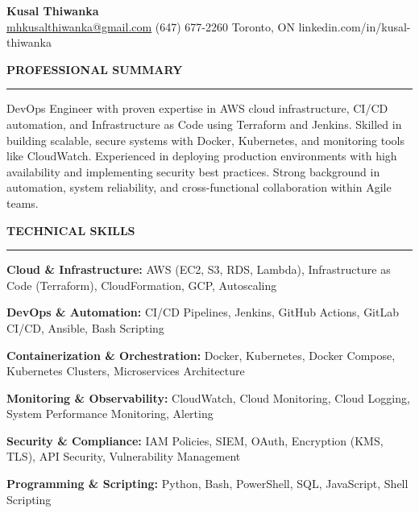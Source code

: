 \documentclass[10pt,letterpaper]{article}
\begin{document}
\begin{center}
{\LARGE\textbf{Kusal Thiwanka}}\\[3pt]
\href{mailto:mhkusalthiwanka@gmail.com}{mhkusalthiwanka@gmail.com}\hspace{2em}%
(647) 677{-}2260\hspace{2em}%
Toronto, ON\hspace{2em}
linkedin.com/in/kusal-thiwanka
\end{center}

\vspace{6pt}

\textbf{PROFESSIONAL SUMMARY}\\[-8pt]
\noindent\rule{\textwidth}{1pt}

\vspace{-2pt}

DevOps Engineer with proven expertise in AWS cloud infrastructure, CI/CD automation, and Infrastructure as Code using Terraform and Jenkins. Skilled in building scalable, secure systems with Docker, Kubernetes, and monitoring tools like CloudWatch. Experienced in deploying production environments with high availability and implementing security best practices. Strong background in automation, system reliability, and cross-functional collaboration within Agile teams.

\vspace{8pt}

\textbf{TECHNICAL SKILLS}\\[-8pt]
\noindent\rule{\textwidth}{1pt}

\vspace{-2pt}

\textbf{Cloud \& Infrastructure:} AWS (EC2, S3, RDS, Lambda), Infrastructure as Code (Terraform), CloudFormation, GCP, Autoscaling

\textbf{DevOps \& Automation:} CI/CD Pipelines, Jenkins, GitHub Actions, GitLab CI/CD, Ansible, Bash Scripting

\textbf{Containerization \& Orchestration:} Docker, Kubernetes, Docker Compose, Kubernetes Clusters, Microservices Architecture

\textbf{Monitoring \& Observability:} CloudWatch, Cloud Monitoring, Cloud Logging, System Performance Monitoring, Alerting

\textbf{Security \& Compliance:} IAM Policies, SIEM, OAuth, Encryption (KMS, TLS), API Security, Vulnerability Management

\textbf{Programming \& Scripting:} Python, Bash, PowerShell, SQL, JavaScript, Shell Scripting
\end{document}
